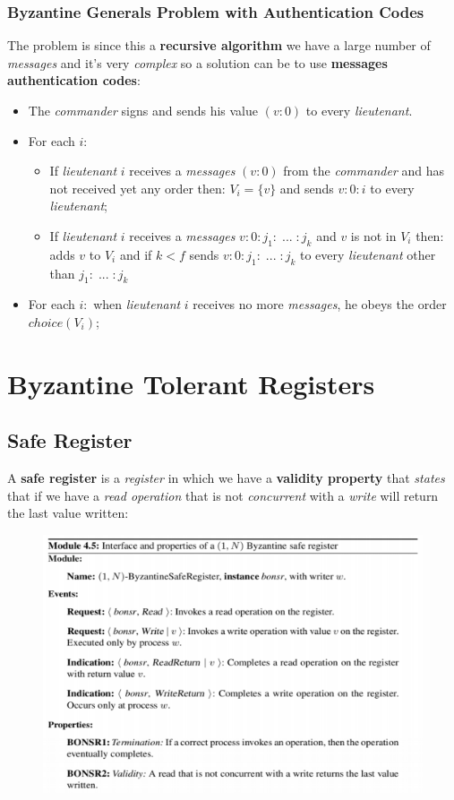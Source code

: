 \documentclass{article}
\begin{document}
\subsubsection{Byzantine Generals Problem with Authentication Codes}
The problem is since this a \textbf{recursive algorithm} we have a large number of \emph{messages} and it's very \emph{complex} so a solution can be to use \textbf{messages authentication codes}:
\begin{itemize}
\item The \emph{commander} signs and sends his value $(v:0)$ to every \emph{lieutenant}. 
\item For each $i$:
\begin{itemize}
\item If \emph{lieutenant} $i$ receives a \emph{messages} $(v:0)$ from the \emph{commander} and has not received yet any order then: $V_i = \{ v \}$ and sends $v:0:i$ to every \emph{lieutenant};
\item If \emph{lieutenant} $i$ receives a \emph{messages} $v:0:j_1:\;...\;:j_k$ and $v$ is not in $V_i$ then: adds $v$ to $V_i$ and if $k<f$ sends $v:0:j_1:\;...\;:j_k$  to every \emph{lieutenant} other than $j_1:\;...\;:j_k$
\end{itemize}
\item For each $i:$ when \emph{lieutenant} $i$ receives no more \emph{messages}, he obeys the order $choice(V_i)$;
\end{itemize}
\section{Byzantine Tolerant Registers}
\subsection{Safe Register}
A \textbf{safe register} is a \emph{register} in which we have a \textbf{validity property} that \emph{states} that if we have a \emph{read operation} that is not \emph{concurrent} with a \emph{write} will return the last value written:
\begin{figure}[H]
  \centering
  \includegraphics[scale=0.9,left]{cattura87.png}
\end{figure}
\end{document}
